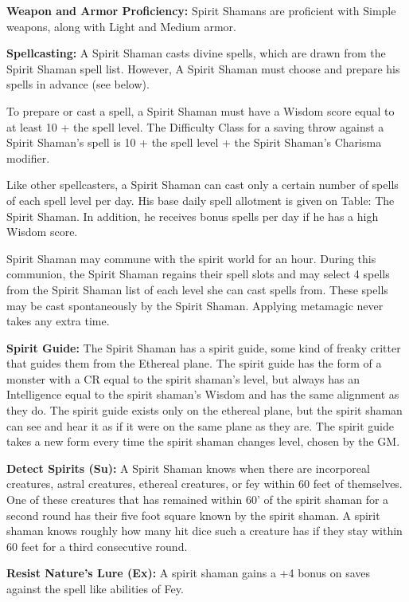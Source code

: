 \classfeatures

\textbf{Weapon and Armor Proficiency:} Spirit Shamans are proficient with Simple weapons, along with Light and Medium armor.

\textbf{Spellcasting:} A Spirit Shaman casts divine spells, which are drawn from the Spirit Shaman spell list. However, A Spirit Shaman must choose and prepare his spells in advance (see below).

To prepare or cast a spell, a Spirit Shaman must have a Wisdom score equal to at least 10 + the spell level. The Difficulty Class for a saving throw against a Spirit Shaman's spell is 10 + the spell level + the Spirit Shaman's Charisma modifier.

Like other spellcasters, a Spirit Shaman can cast only a certain number of spells of each spell level per day. His base daily spell allotment is given on Table: The Spirit Shaman. In addition, he receives bonus spells per day if he has a high Wisdom score.

Spirit Shaman may commune with the spirit world for an hour. During this communion, the Spirit Shaman regains their spell slots and may select 4 spells from the Spirit Shaman list of each level she can cast spells from. These spells may be cast spontaneously by the Spirit Shaman. Applying metamagic never takes any extra time.

\textbf{Spirit Guide:} The Spirit Shaman has a spirit guide, some kind of freaky critter that guides them from the Ethereal plane. The spirit guide has the form of a monster with a CR equal to the spirit shaman's level, but always has an Intelligence equal to the spirit shaman's Wisdom and has the same alignment as they do. The spirit guide exists only on the ethereal plane, but the spirit shaman can see and hear it as if it were on the same plane as they are. The spirit guide takes a new form every time the spirit shaman changes level, chosen by the GM.

\textbf{Detect Spirits (Su):} A Spirit Shaman knows when there are incorporeal creatures, astral creatures, ethereal creatures, or fey within 60 feet of themselves. One of these creatures that has remained within 60' of the spirit shaman for a second round has their five foot square known by the spirit shaman. A spirit shaman knows roughly how many hit dice such a creature has if they stay within 60 feet for a third consecutive round.

\textbf{Resist Nature's Lure (Ex):} A spirit shaman gains a +4 bonus on saves against the spell like abilities of Fey.

